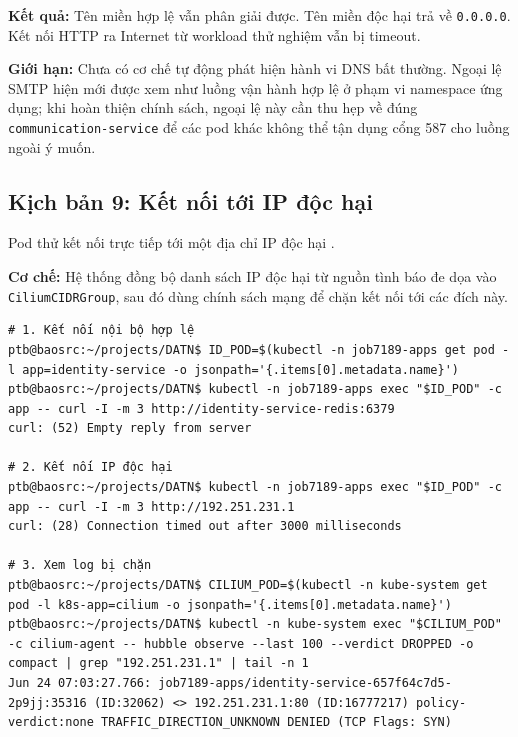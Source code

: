 \textbf{Kết quả:} Tên miền hợp lệ vẫn phân giải được. Tên miền độc hại trả về \texttt{0.0.0.0}. Kết nối HTTP ra Internet từ workload thử nghiệm vẫn bị timeout.

\textbf{Giới hạn:} Chưa có cơ chế tự động phát hiện hành vi DNS bất thường. Ngoại lệ SMTP hiện mới được xem như luồng vận hành hợp lệ ở phạm vi namespace ứng dụng; khi hoàn thiện chính sách, ngoại lệ này cần thu hẹp về đúng \texttt{communication-service} để các pod khác không thể tận dụng cổng 587 cho luồng ngoài ý muốn.

\subsection{Kịch bản 9: Kết nối tới IP độc hại}
\label{subsec:c3_kb9}

Pod thử kết nối trực tiếp tới một địa chỉ IP độc hại \parencite{mitre_t1071}.

\textbf{Cơ chế:} Hệ thống đồng bộ danh sách IP độc hại từ nguồn tình báo đe dọa vào \texttt{CiliumCIDRGroup}, sau đó dùng chính sách mạng để chặn kết nối tới các đích này.

\begin{listing}[H]
\begin{verbatim}
# 1. Kết nối nội bộ hợp lệ
ptb@baosrc:~/projects/DATN$ ID_POD=$(kubectl -n job7189-apps get pod -l app=identity-service -o jsonpath='{.items[0].metadata.name}')
ptb@baosrc:~/projects/DATN$ kubectl -n job7189-apps exec "$ID_POD" -c app -- curl -I -m 3 http://identity-service-redis:6379
curl: (52) Empty reply from server

# 2. Kết nối IP độc hại
ptb@baosrc:~/projects/DATN$ kubectl -n job7189-apps exec "$ID_POD" -c app -- curl -I -m 3 http://192.251.231.1
curl: (28) Connection timed out after 3000 milliseconds

# 3. Xem log bị chặn
ptb@baosrc:~/projects/DATN$ CILIUM_POD=$(kubectl -n kube-system get pod -l k8s-app=cilium -o jsonpath='{.items[0].metadata.name}')
ptb@baosrc:~/projects/DATN$ kubectl -n kube-system exec "$CILIUM_POD" -c cilium-agent -- hubble observe --last 100 --verdict DROPPED -o compact | grep "192.251.231.1" | tail -n 1
Jun 24 07:03:27.766: job7189-apps/identity-service-657f64c7d5-2p9jj:35316 (ID:32062) <> 192.251.231.1:80 (ID:16777217) policy-verdict:none TRAFFIC_DIRECTION_UNKNOWN DENIED (TCP Flags: SYN)
\end{verbatim}
\caption{Kiểm thử chặn kết nối tới IP độc hại}
\label{lst:c3_kb9}
\end{listing}

